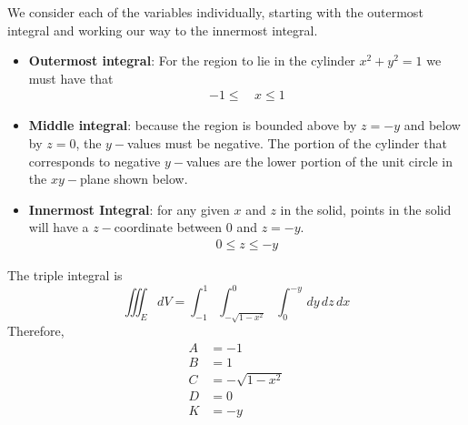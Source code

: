     \ifnum {} 
    {\color{DarkBlue} We consider each of the variables individually, starting with the outermost integral and working our way to the innermost integral. 
    \begin{itemize}
        \item \textbf{Outermost integral}: For the region to lie in the cylinder $x^2+y^2=1$ we must have that 
        \begin{align}
            -1 \le \, &x \le 1 
        \end{align}
        \item \textbf{Middle integral}: because the region is bounded above by $z = -y$ and below by $z=0$, the $y-$values must be negative. The portion of the cylinder that corresponds to negative $y-$values are the lower portion of the unit circle in the $xy-$plane shown below.
        \begin{center}     
        \end{center}         
        \item \textbf{Innermost Integral}: for any given $x$ and $z$ in the solid, points in the solid will have a $z-$coordinate between $0$ and $z=-y$. 
        \begin{align}
            0 \le z \le -y
        \end{align}
    \end{itemize}

    The triple integral is
    $$\displaystyle \iiint_E dV = \int_{-1}^{1}\int_{-\sqrt{1-x^2}}^{0} \int_0^{-y} \, dy \, dz \, dx$$
    Therefore,
    \begin{align}
        A &= -1 \\
        B &= 1 \\
        C & = -\sqrt{1-x^2}\\
        D &= 0 \\
        K &= - y
    \end{align}

    }
   \else


